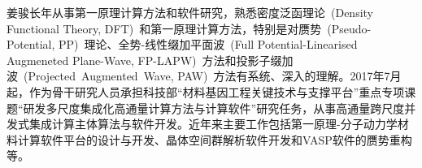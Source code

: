\maketitle
姜骏长年从事第一原理计算方法和软件研究，熟悉密度泛函理论~(\textrm{Density Functional Theory, DFT})~和第一原理计算方法，特别是对赝势~(\textrm{Pseudo-Potential, PP})~理论、全势-线性缀加平面波~(\textrm{Full Potential-Linearised Augmeneted Plane-Wave, FP-LAPW})~方法和投影子缀加波~(\textrm{Projected~Augmented~Wave, PAW})~方法有系统、深入的理解。2017年7月起，作为骨干研究人员承担科技部“材料基因工程关键技术与支撑平台”重点专项课题“研发多尺度集成化高通量计算方法与计算软件”研究任务，从事高通量跨尺度并发式集成计算主体算法与软件开发。近年来主要工作包括第一原理-分子动力学材料计算软件平台的设计与开发、晶体空间群解析软件开发和\textrm{VASP}软件的赝势重构等。


